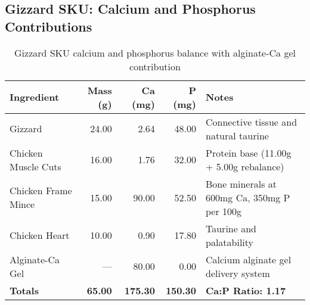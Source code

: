 \vspace{1em}  

\subsection*{Gizzard SKU: Calcium and Phosphorus Contributions}  
\begin{table}[htbp]  
\centering  
\begin{tabular}{@{}l r r r p{7.0cm}@{}}  
\toprule  
Ingredient & Mass (g) & Ca (mg) & P (mg) & Notes \\  
\midrule  
Gizzard & 24.00 & 2.64 & 48.00 & Connective tissue and natural taurine \\
Chicken Muscle Cuts & 16.00 & 1.76 & 32.00 & Protein base (11.00g + 5.00g rebalance) \\
Chicken Frame Mince & 15.00 & 90.00 & 52.50 & Bone minerals at 600mg Ca, 350mg P per 100g \cite{gopalakrishnan2019bonecomposition,usdaFDCbone2021}\\
Chicken Heart & 10.00 & 0.90 & 17.80 & Taurine and palatability \\
Alginate-Ca Gel & --- & 80.00 & 0.00 & Calcium alginate gel delivery system \\
\midrule
\textbf{Totals} & \textbf{65.00} & \textbf{175.30} & \textbf{150.30} & \textbf{Ca:P Ratio: 1.17} \\
\bottomrule  
\end{tabular}  
\caption*{Gizzard SKU calcium and phosphorus balance with alginate-Ca gel contribution}  
\end{table}  

\vspace{1em}  

